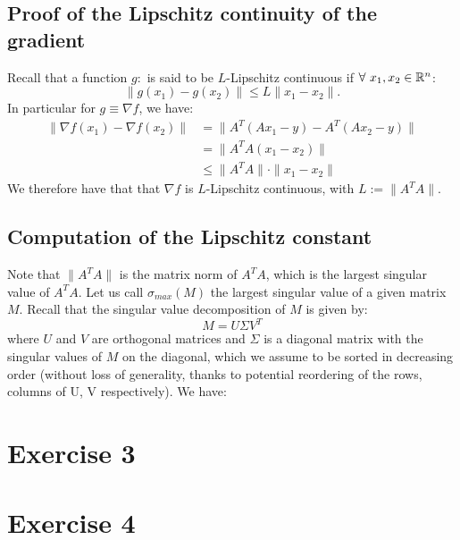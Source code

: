 \documentclass[12pt]{article}
\begin{document}
\subsection{Proof of the Lipschitz continuity of the gradient}
Recall that a function $g: $ is said to be $L$-Lipschitz continuous if $\forall\ x_1, x_2 \in \mathbb{R}^n$:
\begin{equation}
  \|g(x_1) - g(x_2)\| \leq L \|x_1 - x_2\|.
\end{equation}
In particular for $g \equiv \nabla f$, we have:
\begin{align*}
  \| \nabla f (x_1) - \nabla f (x_2) \|
   & = \| A^T(Ax_1 - y) - A^T(Ax_2 - y) \| \\
   & = \| A^T A(x_1 - x_2) \| \\
   & \leq \| A^T A \| \cdot \| x_1 - x_2 \|
\end{align*}
We therefore have that that $\nabla f$ is $L$-Lipschitz continuous, with $L := \| A^T A \|$.

\subsection{Computation of the Lipschitz constant}
Note that $\| A^T A \|$ is the matrix norm of $A^T A$, which is the largest singular value of $A^T A$. Let us call $\sigma_{max}(M)$ the largest singular value of a given matrix $M$. Recall that the singular value decomposition of $M$ is given by:
\begin{equation}
  M = U \Sigma V^T
\end{equation}
where $U$ and $V$ are orthogonal matrices and $\Sigma$ is a diagonal matrix with the singular values of $M$ on the diagonal, which we assume to be sorted in decreasing order (without loss of generality, thanks to potential reordering of the rows, columns of U, V respectively). We have:






\section{Exercise 3}
\section{Exercise 4}


\end{document}
